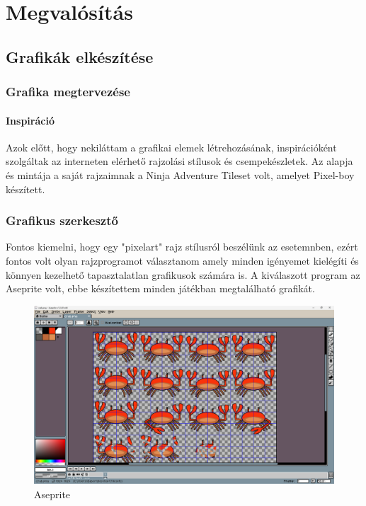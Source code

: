 \chapter{Megvalósítás}

\section{Grafikák elkészítése}

\subsection{Grafika megtervezése}

\subsubsection{Inspiráció}
Azok előtt, hogy nekiláttam a grafikai elemek létrehozásának, inspirációként szolgáltak az interneten elérhető rajzolási stílusok és csempekészletek. Az alapja és mintája a saját rajzaimnak a Ninja Adventure Tileset volt, amelyet Pixel-boy készített.\cite{NAT}

\subsection{Grafikus szerkesztő}

Fontos kiemelni, hogy egy "pixelart" rajz stílusról beszélünk az esetemnben, ezért fontos volt olyan rajzprogramot választanom amely minden igényemet kielégíti és könnyen kezelhető tapasztalatlan grafikusok számára is. A kiválaszott program az Aseprite volt, ebbe készítettem minden játékban megtalálható grafikát. \cite{Aseprite}

\begin{figure}[H]
    \centering
    \includegraphics[width=14.0truecm]{images/Aseprite.png}
    \caption{Aseprite}
    \label{fig:Aseprite}
\end{figure}


